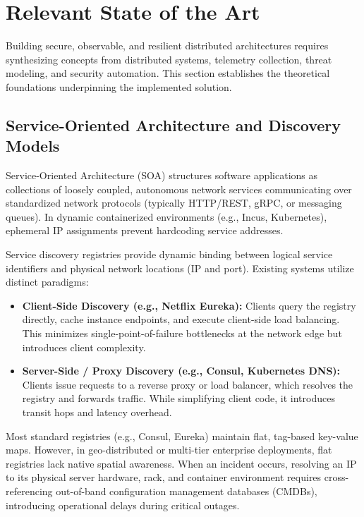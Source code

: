 \section{Relevant State of the Art}
\label{sec:state_of_the_art}

Building secure, observable, and resilient distributed architectures requires synthesizing concepts from distributed systems, telemetry collection, threat modeling, and security automation. This section establishes the theoretical foundations underpinning the implemented solution.

\subsection{Service-Oriented Architecture and Discovery Models}
Service-Oriented Architecture (SOA) structures software applications as collections of loosely coupled, autonomous network services communicating over standardized network protocols (typically HTTP/REST, gRPC, or messaging queues). In dynamic containerized environments (e.g., Incus, Kubernetes), ephemeral IP assignments prevent hardcoding service addresses. 

Service discovery registries provide dynamic binding between logical service identifiers and physical network locations (IP and port). Existing systems utilize distinct paradigms:
\begin{itemize}
    \item \textbf{Client-Side Discovery (e.g., Netflix Eureka):} Clients query the registry directly, cache instance endpoints, and execute client-side load balancing. This minimizes single-point-of-failure bottlenecks at the network edge but introduces client complexity.
    \item \textbf{Server-Side / Proxy Discovery (e.g., Consul, Kubernetes DNS):} Clients issue requests to a reverse proxy or load balancer, which resolves the registry and forwards traffic. While simplifying client code, it introduces transit hops and latency overhead.
\end{itemize}
Most standard registries (e.g., Consul, Eureka) maintain flat, tag-based key-value maps. However, in geo-distributed or multi-tier enterprise deployments, flat registries lack native spatial awareness. When an incident occurs, resolving an IP to its physical server hardware, rack, and container environment requires cross-referencing out-of-band configuration management databases (CMDBs), introducing operational delays during critical outages.

